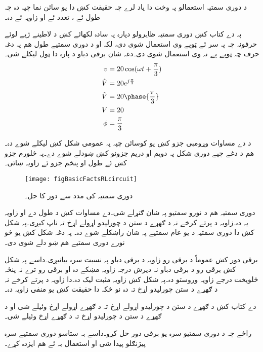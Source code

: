 د دوری سمتیہ استعمالو پہ وخت دا یاد لرے چہ حقیقت کښ دا یو سائن نما چپہ دہ چہ طول ئے ، تعدد ئے  او زاویہ ئے  دہ۔

پہ دے کتاب کښ دوری سمتیہ ظاہرولو دپارہ پہ سادہ لکھائے کښ  د لاطینے ژبے  لوئے حرفونہ چہ پہ سر ئے ټوپے وی استعمال شوی دی، لکہ  او د دوری سمتیے طول ھم پہ دغہ حرف چہ ټوپے پے نہ وی استعمال شوی دی۔دغہ شان برقی دباو  د پارہ دا ټول لیکلے شی۔
\begin{gather}
\begin{aligned}
v&=20 \cos (\omega t +\frac{\pi}{3})\\
\hat{V}&=20 e^{j \frac{\pi}{3}}\\
\hat{V}&=20 \phase{\frac{\pi}{3}}\\
V&=20\\
\phi&=\frac{\pi}{3}
\end{aligned}
\end{gather}

 د دے مساوات  وړومبی جزو کښ یو کوسائن چپہ پہ عمومی شکل کښ لیکلے شوے دہ۔ھم د دغے چپے دوری شکل پہ دویم او دریم جزونو کښ ښودلے شوے دے۔پہ څلورم جزو کښ ئے طول او پنځم جزو ئے زاویہ ښائی۔
\begin{figure}
\centering
\texttt{[image: figBasicFactsRLcircuit]}
\caption{دوری سمتیہ کی مدد سے  دور کا حل۔}
\label{شکل_حقائق_دوری_سمتیہ_سے_دور_حل}
\end{figure}
دوری سمتیہ ھم د نورو سمتیو پہ شان ګنړلے شی۔دے مساوات کښ د  طول  دے او  زاویہ یہ  دہ۔زاویہ د پرتے کرخے  نہ د ګھړے د ستن د چورلیدو  اړولے  اړخ  تہ ناپ کیږی۔پہ شکل  کښ دا دوری سمتیہ د یو عام سمتیے پہ شان راښکلے شوے دہ۔ پہ دغہ شکل کښ یو څو نورے دوری سمتیے ھم ښو دلے شوی دی۔

برقی دور کښ عموماً د برقی رو زاویہ د برقی دباو پہ نسبت سرہ بیانیږی۔داسے پہ شکل  کښ  برقی رو د برقی دباو نہ دیرش درجہ زاویہ مښکے دہ او برقی رو  ترے نہ پنځہ څلویخت درجے زاویہ وروستو دہ۔پہ شکل کښ   زاویہ مثبت لیک دہ۔دا زاویہ د پرتے کرخے نہ د ګھړے د ستن چورلیدو اړخ تہ دہ نو ځکہ دا  حقیقت کښ یو منفی زاویہ دہ۔

دے کتاب کښ د ګھړے د ستن د چورلیدو اړولے اړخ تہ د ګھړے اړولے اړخ وئیلے شی او د ګھړے د ستن د چورلیدو اړخ تہ د ګھړے اړخ وئیلے شی۔

راځے چہ د دوری سمتیو سرہ یو برقی دور حل کړو۔داسے بہ ستاسو دوری سمتیے سرہ  پیژنګلو پیدا شی او استعمال بہ ئے ھم ایزدہ کړے۔ 

